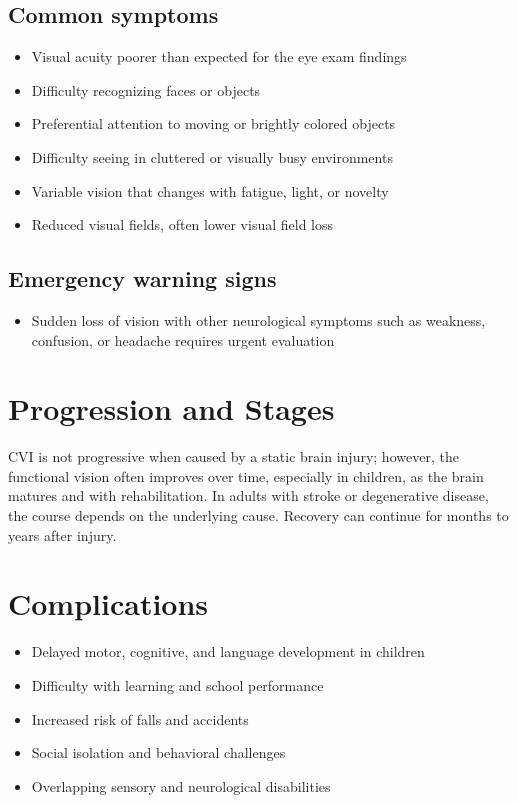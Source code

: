 \subsection{Common symptoms}
\begin{itemize}[noitemsep]
  \item Visual acuity poorer than expected for the eye exam findings
  \item Difficulty recognizing faces or objects
  \item Preferential attention to moving or brightly colored objects
  \item Difficulty seeing in cluttered or visually busy environments
  \item Variable vision that changes with fatigue, light, or novelty
  \item Reduced visual fields, often lower visual field loss
\end{itemize}
\subsection{Emergency warning signs}
\begin{itemize}[noitemsep]
  \item Sudden loss of vision with other neurological symptoms such as weakness, confusion, or headache requires urgent evaluation
\end{itemize}
\section{Progression and Stages}
CVI is not progressive when caused by a static brain injury; however, the functional vision often improves over time, especially in children, as the brain matures and with rehabilitation. In adults with stroke or degenerative disease, the course depends on the underlying cause. Recovery can continue for months to years after injury.
\section{Complications}
\begin{itemize}[noitemsep]
  \item Delayed motor, cognitive, and language development in children
  \item Difficulty with learning and school performance
  \item Increased risk of falls and accidents
  \item Social isolation and behavioral challenges
  \item Overlapping sensory and neurological disabilities
\end{itemize}
